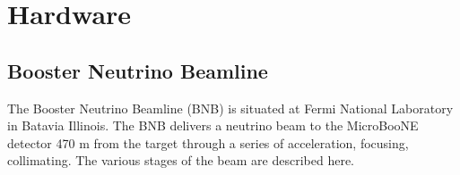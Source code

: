 \documentclass[12pt]{article}
\begin{document}
%



\newpage

\section{Hardware}
\subsection{Booster Neutrino Beamline}
The Booster Neutrino Beamline (BNB) is situated at Fermi National Laboratory in Batavia Illinois.  The BNB delivers a neutrino beam to the MicroBooNE detector 470 m from the target through a series of acceleration, focusing, collimating. The various stages of the beam are described here.  
\end{document}
